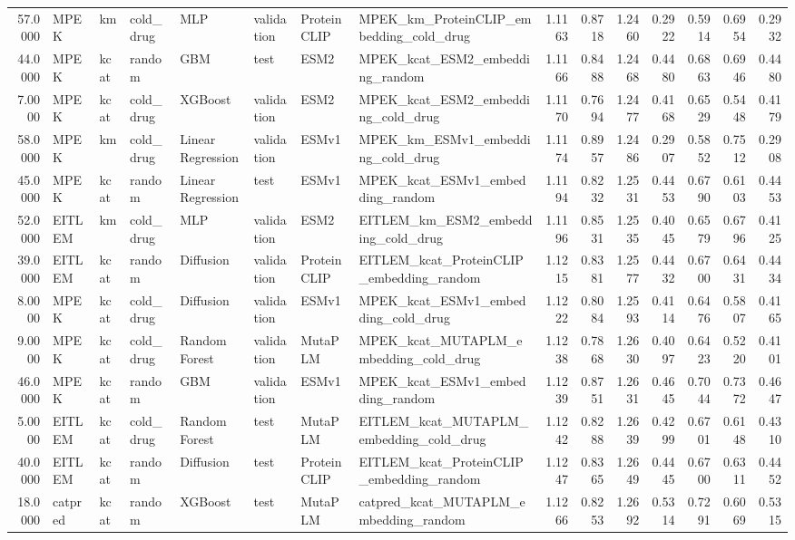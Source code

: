 \begin{tabular}{rlllllllrrrrrrr}
57.0000 & MPEK & km & cold_drug & MLP & validation & ProteinCLIP & MPEK_km_ProteinCLIP_embedding_cold_drug & 1.1163 & 0.8718 & 1.2460 & 0.2922 & 0.5914 & 0.6954 & 0.2932 \\
44.0000 & MPEK & kcat & random & GBM & test & ESM2 & MPEK_kcat_ESM2_embedding_random & 1.1166 & 0.8488 & 1.2468 & 0.4480 & 0.6863 & 0.6946 & 0.4480 \\
7.0000 & MPEK & kcat & cold_drug & XGBoost & validation & ESM2 & MPEK_kcat_ESM2_embedding_cold_drug & 1.1170 & 0.7694 & 1.2477 & 0.4168 & 0.6529 & 0.5448 & 0.4179 \\
58.0000 & MPEK & km & cold_drug & Linear Regression & validation & ESMv1 & MPEK_km_ESMv1_embedding_cold_drug & 1.1174 & 0.8957 & 1.2486 & 0.2907 & 0.5852 & 0.7512 & 0.2908 \\
45.0000 & MPEK & kcat & random & Linear Regression & test & ESMv1 & MPEK_kcat_ESMv1_embedding_random & 1.1194 & 0.8232 & 1.2531 & 0.4453 & 0.6790 & 0.6103 & 0.4453 \\
52.0000 & EITLEM & km & cold_drug & MLP & validation & ESM2 & EITLEM_km_ESM2_embedding_cold_drug & 1.1196 & 0.8531 & 1.2535 & 0.4045 & 0.6579 & 0.6796 & 0.4125 \\
39.0000 & EITLEM & kcat & random & Diffusion & validation & ProteinCLIP & EITLEM_kcat_ProteinCLIP_embedding_random & 1.1215 & 0.8381 & 1.2577 & 0.4432 & 0.6700 & 0.6431 & 0.4434 \\
8.0000 & MPEK & kcat & cold_drug & Diffusion & validation & ESMv1 & MPEK_kcat_ESMv1_embedding_cold_drug & 1.1222 & 0.8084 & 1.2593 & 0.4114 & 0.6476 & 0.5807 & 0.4165 \\
9.0000 & MPEK & kcat & cold_drug & Random Forest & validation & MutaPLM & MPEK_kcat_MUTAPLM_embedding_cold_drug & 1.1238 & 0.7868 & 1.2630 & 0.4097 & 0.6423 & 0.5220 & 0.4101 \\
46.0000 & MPEK & kcat & random & GBM & validation & ESMv1 & MPEK_kcat_ESMv1_embedding_random & 1.1239 & 0.8751 & 1.2631 & 0.4645 & 0.7044 & 0.7372 & 0.4647 \\
5.0000 & EITLEM & kcat & cold_drug & Random Forest & test & MutaPLM & EITLEM_kcat_MUTAPLM_embedding_cold_drug & 1.1242 & 0.8288 & 1.2639 & 0.4299 & 0.6701 & 0.6148 & 0.4310 \\
40.0000 & EITLEM & kcat & random & Diffusion & test & ProteinCLIP & EITLEM_kcat_ProteinCLIP_embedding_random & 1.1247 & 0.8365 & 1.2649 & 0.4445 & 0.6700 & 0.6311 & 0.4452 \\
18.0000 & catpred & kcat & random & XGBoost & test & MutaPLM & catpred_kcat_MUTAPLM_embedding_random & 1.1266 & 0.8253 & 1.2692 & 0.5314 & 0.7291 & 0.6069 & 0.5315 \\

\end{tabular}
